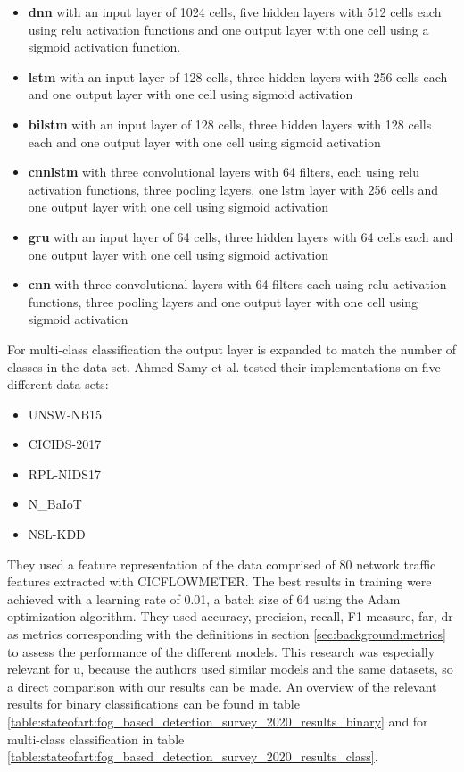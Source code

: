 \begin{itemize}
	\item \textbf{\gls{dnn}} with an input layer of 1024 cells, five hidden layers with 512 cells each using \gls{relu} activation functions and one output layer with one cell using a sigmoid activation function.
	\item \textbf{\gls{lstm}} with an input layer of 128 cells, three hidden layers with 256 cells each and one output layer with one cell using sigmoid activation 
	\item \textbf{\gls{bilstm}} with an input layer of 128 cells, three hidden layers with 128 cells each and one output layer with one cell using sigmoid activation
	\item \textbf{\gls{cnnlstm}} with three convolutional layers with 64 filters, each using \gls{relu} activation functions, three pooling layers, one \gls{lstm} layer with 256 cells and one output layer with one cell using sigmoid activation
	\item \textbf{\gls{gru}} with an input layer of 64 cells, three hidden layers with 64 cells each and one output layer with one cell using sigmoid activation
	\item \textbf{\gls{cnn}} with three convolutional layers with 64 filters each using \gls{relu} activation functions, three pooling layers and one output layer with one cell using sigmoid activation
\end{itemize}

For multi-class classification the output layer is expanded to match the number of classes in the data set. Ahmed Samy et al. tested their implementations on five different data sets:

\begin{itemize}
	\item UNSW-NB15 \cite{unsw_nb15}
	\item CICIDS-2017 \cite{cic_ids_2017}
	\item RPL-NIDS17 \cite{rpl_nids17}
	\item N\_BaIoT \cite{n_baiot}
	\item NSL-KDD \cite{nsl_kdd}
\end{itemize}

They used a feature representation of the data comprised of 80 network traffic features extracted with CICFLOWMETER. The best results in training were achieved with a learning rate of 0.01, a batch size of 64 using the Adam optimization algorithm. They used accuracy, precision, recall, F1-measure, \gls{far}, \gls{dr} as metrics corresponding with the definitions in section \ref{sec:background:metrics} to assess the performance of the different models. This research was especially relevant for u, because the authors used similar models and the same datasets, so a direct comparison with our results can be made. An overview of the relevant results for binary classifications can be found in table \ref{table:stateofart:fog_based_detection_survey_2020_results_binary} and for multi-class classification in table \ref{table:stateofart:fog_based_detection_survey_2020_results_class}.

